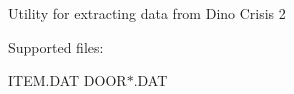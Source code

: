 Utility for extracting data from Dino Crisis 2

Supported files\+:

I\+T\+E\+M.\+D\+AT D\+O\+O\+R$\ast$.D\+AT 